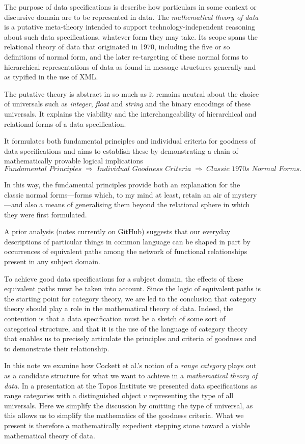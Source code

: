 

The purpose of data specifications is describe how particulars in some context or discursive domain
are to be represented in data. 
The \textit{mathematical theory of data} is a putative meta-theory 
intended to support technology-independent reasoning about such data specifications, whatever form they may take. 
Its scope spans the relational theory of data that originated in 1970, including the five or so definitions of normal form,
and the later re-targeting of these normal forms to hierarchical representations 
of data as found in message structures generally and as typified in the use of XML.

The putative theory is abstract in so much as it remains neutral about the choice of universals such as \textit{integer}, \textit{float} and \textit{string} and the binary encodings of these universals. 
It explains the viability and the interchangeability of hierarchical and relational forms of a data specification.  

It formulates both fundamental principles and individual criteria for goodness of data specifications and aims to establish these by demonstrating a chain of mathematically provable logical implications 
\[
\textit{Fundamental Principles}
\;\Longrightarrow\;
\textit{Individual Goodness Criteria}
\;\Longrightarrow\;
\textit{Classic 1970s Normal Forms}.
\]
 
In this way, the fundamental principles provide both an explanation for the classic normal forms—forms which, to my mind at least, retain an air of mystery—and also a means of generalising them beyond the relational sphere in which they were first formulated.

A prior analysis (notes currently on GitHub) suggests that our everyday descriptions of particular things in common language can be shaped in part by  occurrences of equivalent paths among the network of functional relationships present in any subject domain. 

To achieve good data specifications for a subject domain, the effects of these  equivalent paths must be taken into account. 
Since the logic of equivalent paths is the starting point for category theory, we are led to the conclusion that 
category theory should play a role in the mathematical theory of data. Indeed, the contention is that
a data specification must be a sketch of some sort of categorical structure, 
and that it is the use of the language of category theory that enables us to precisely articulate 
the principles and criteria of goodness and to demonstrate their relationship.

In this note we examine how Cockett et al.'s notion of a \emph{range category} plays out as a candidate structure for what we want to achieve in a \textit{mathematical theory of data}. In a presentation at the Topos Institute 
we presented data specifications as range categories with a distinguished object $v$ representing the type of all universals. Here we simplify the discussion by omitting the type of universal, 
as this allows us to simplify the mathematics of the goodness criteria.
What we present is therefore a mathematically expedient stepping stone toward a viable mathematical theory of data.
